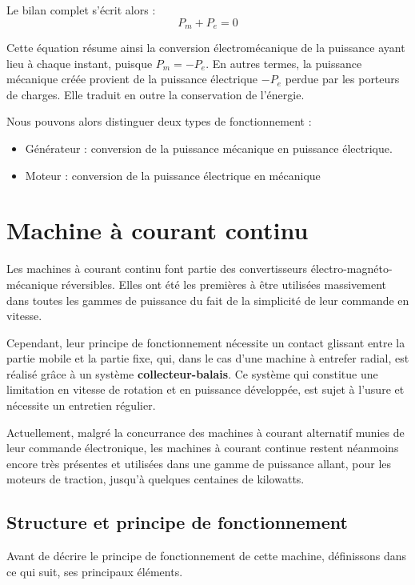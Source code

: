 \documentclass[12pt,prb,aps,epsf]{article}
\begin{document}
Le bilan complet s'écrit alors :
\begin{equation}
    P_m + P_e = 0
\end{equation}

Cette équation résume ainsi la conversion électromécanique de la puissance ayant lieu à chaque instant, puisque $P_m = - P_e$. En autres termes, la puissance mécanique créée provient de la puissance électrique $-P_e$ perdue par les porteurs de charges. Elle traduit en outre la conservation de l'énergie.\medskip

Nous pouvons alors distinguer deux types de fonctionnement :

\begin{itemize}
    \item Générateur : conversion de la puissance mécanique en puissance électrique.
    \item Moteur : conversion de la puissance électrique en mécanique
\end{itemize}

\section{Machine à courant continu}
Les machines à courant continu font partie des convertisseurs électro-magnéto-mécanique réversibles. Elles ont été les premières à être utilisées massivement dans toutes les gammes de puissance du fait de la simplicité de leur commande en vitesse.\medskip

Cependant, leur principe de fonctionnement nécessite un contact glissant entre la partie mobile et la partie fixe, qui, dans le cas d'une machine à entrefer radial, est réalisé grâce à un système \textbf{collecteur-balais}. Ce système qui constitue une limitation en vitesse de rotation et en puissance développée, est sujet à l'usure et nécessite un entretien régulier.\medskip

Actuellement, malgré la concurrance des machines à courant alternatif munies de leur commande électronique, les machines à courant continue restent néanmoins encore très présentes et utilisées dans une gamme de puissance allant, pour les moteurs de traction, jusqu'à quelques centaines de kilowatts.\medskip


\subsection{Structure et principe de fonctionnement}

Avant de décrire le principe de fonctionnement de cette machine, définissons dans ce qui suit, ses principaux éléments.\medskip
\end{document}
